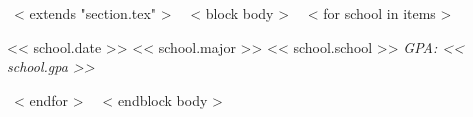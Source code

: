 ~< extends "section.tex" >~
~< block body >~
  ~< for school in items >~
    \begin{samepage}
      \cventry
        {<< school.date >>}
        {<< school.major >>}
        {<< school.school >>}
        {}
        {\textit{GPA: << school.gpa >>}}
        {}
    \end{samepage}
  ~< endfor >~
~< endblock body >~
